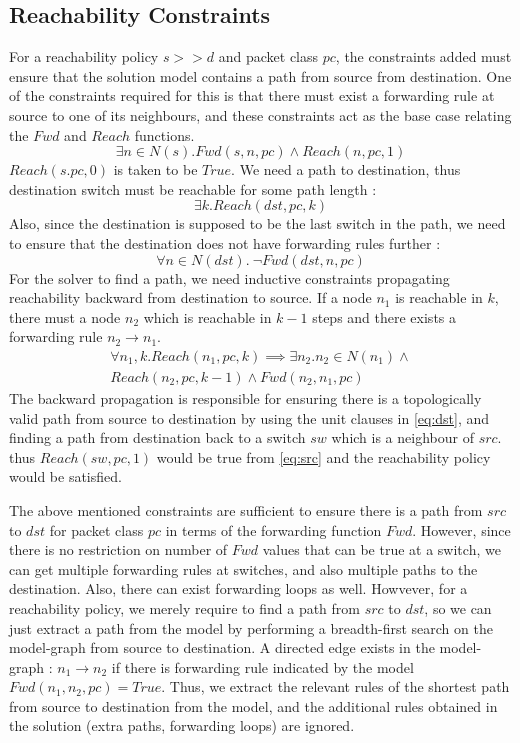 \documentclass[]{sig}
\begin{document}
\subsection{Reachability Constraints} \label{sec:reach}
For a reachability policy $s >> d$ and packet class $pc$, the constraints added must ensure that the solution model contains a path from source from destination. One of the constraints required for this is that there must exist a forwarding rule at source to one of its neighbours, and these constraints act as the base case relating the $Fwd$ and $Reach$ functions. 
\begin{equation} \label{eq:src}
	\exists n \in N(s). Fwd(s, n, pc) \wedge Reach(n, pc, 1)
\end{equation}
$Reach(s.pc,0)$ is taken to be $True$. We need a path to destination, thus destination switch must be reachable for some path length : 
\begin{equation} \label{eq:dst}
	\exists k. Reach(dst, pc, k)
\end{equation}
Also, since the destination is supposed to be the last switch in the path, we need to ensure that the destination does not have forwarding rules further : 
\begin{equation}
	\forall n \in N(dst). \ \neg Fwd(dst, n, pc)
\end{equation}
For the solver to find a path, we need inductive constraints propagating reachability backward from destination to source. If a node $n_1$ is reachable in $k$, there must a node $n_2$ which is reachable in  $k-1$ steps and there exists a forwarding rule $n_2 \rightarrow n_1$.
\begin{multline} \label{eq:bckprop}
\forall n_1,k.  Reach(n_1,pc,k) \implies \exists n_2.  n_2 \in N(n_1) \wedge \\ Reach(n_2,pc,k-1) \wedge Fwd(n_2,n_1,pc)
\end{multline} 
The backward propagation is responsible for ensuring there is a topologically valid path from source to destination by using the unit clauses in \cref{eq:dst}, and finding a path from destination back to a switch $sw$ which is a neighbour of $src$. thus $Reach(sw,pc,1)$ would be true from \cref{eq:src} and the reachability policy would be satisfied. 

The above mentioned constraints are sufficient to ensure there is a path from $src$ to $dst$ for packet class $pc$ in terms of the forwarding function $Fwd$. However, since there is no restriction on number of $Fwd$ values that can be true at a switch, we can get multiple forwarding rules at switches, and also multiple paths to the destination. Also, there can exist forwarding loops as well. Howvever, for a reachability policy, we merely require to find a path from $src$ to $dst$, so we can just extract a path from the model by performing a breadth-first search on the model-graph from source to destination. A directed edge exists in the model-graph : $n_1 \rightarrow n_2$ if there is forwarding rule indicated by the model $Fwd(n_1,n_2, pc) = True$. Thus, we extract the relevant rules of the shortest path from source to destination from the model, and the additional rules obtained in the solution (extra paths, forwarding loops) are ignored.  
\end{document}
